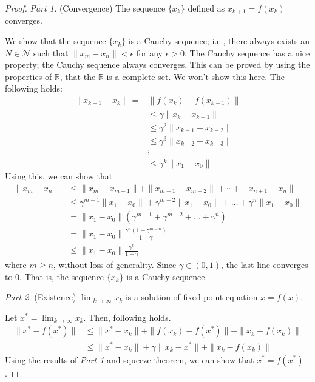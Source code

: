         \begin{proof}
            \textit{Part 1.} (Convergence) The sequence $\{x_k\}$ defined as $x_{k+1}=f(x_k)$ converges.

            We show that the sequence $\{x_k\}$ is a Cauchy sequence; i.e., there always exists an $N \in \mathcal{N}$ such that $\|x_m-x_n\| < \epsilon$ for any $\epsilon > 0$.
            The Cauchy sequence has a nice property; the Cauchy sequence always converges. This can be proved by using the properties of $\mathbb{R}$, that the $\mathbb{R}$ is a complete set.
            We won't show this here. The following holds:
            \begin{align}
                \|x_{k+1}-x_k\| = &\|f(x_k) - f(x_{k-1})\| \\
                                  &\leq \gamma \|x_k - x_{k-1}\| \\
                                  &\leq \gamma^2 \|x_{k-1}-x_{k-2}\| \\
                                  &\leq \gamma^3 \|x_{k-2}-x_{k-3}\| \\
                                  &\vdots \\
                                  &\leq \gamma^k \|x_1 - x_0\|
            \end{align}
            Using this, we can show that
            \begin{align}
                \|x_m - x_n\| &\leq \|x_m - x_{m-1}\| + \|x_{m-1} - x_{m-2}\| + \cdots + \|x_{n+1} - x_n\| \\
                              &\leq \gamma^{m-1}\|x_1-x_0\| + \gamma^{m-2}\|x_1-x_0\| + \dots + \gamma^{n}\|x_1-x_0\| \\
                              &= \|x_1-x_0\| (\gamma^{m-1} + \gamma^{m-2} + \dots + \gamma^n) \\
                              &= \|x_1-x_0\| \frac{\gamma^n(1-\gamma^{m-n})}{1-\gamma} \\
                              &\leq \|x_1-x_0\| \frac{\gamma^n}{1-\gamma}
            \end{align}
            where $m \geq n$, without loss of generality. Since $\gamma \in (0,1)$, the last line converges to 0. That is, the sequence $\{x_k\}$ is a Cauchy sequence.

            \textit{Part 2.} (Existence) $\lim_{k \to \infty} x_k$ is a solution of fixed-point equation $x=f(x)$.

            Let $x^* = \lim_{k \to \infty} x_k$. Then, following holds.
            \begin{align}
                \|x^*-f(x^*)\| &\leq \|x^*-x_k\| + \|f(x_k)-f(x^*)\| + \|x_k-f(x_k)\| \\
                               &\leq \|x^*-x_k\| + \gamma \|x_k - x^*\| + \|x_k - f(x_k)\|
            \end{align}
            Using the results of \textit{Part 1} and squeeze theorem, we can show that $x^*=f(x^*)$.


\end{proof}
